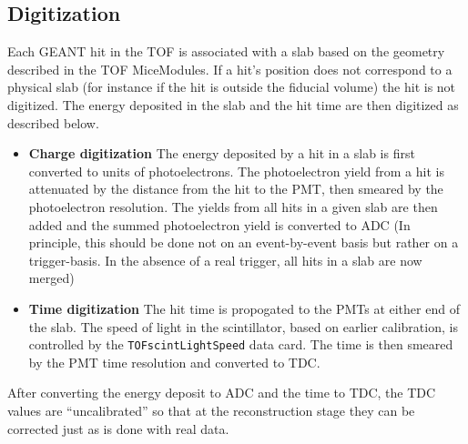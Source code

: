 \subsection{Digitization}
Each GEANT hit in the TOF is associated with a slab based on the 
geometry described in the TOF MiceModules. If a hit's position does not 
correspond to a physical slab (for instance if the hit is outside the fiducial volume) the hit is not digitized.
The energy deposited in the slab and the hit time are then digitized as described below.
\begin{itemize}
\item {\bf{Charge digitization}}
The energy deposited by a hit in a slab is first converted to units of photoelectrons. The photoelectron yield from a hit is attenuated by the distance from the hit to the PMT, then smeared by the photoelectron resolution. The yields from all hits in a given slab are then added and the summed photoelectron yield is converted to ADC (In principle, this should be done not on an event-by-event basis but rather on a trigger-basis. In the absence of a real trigger, all hits in a slab are now merged)
\item {\bf{Time digitization}}
The hit time is propogated to the PMTs at either end of the slab. The speed of light in the scintillator, based on earlier calibration, is controlled by the \verb|TOFscintLightSpeed| data card. The time is then smeared by the PMT time resolution and converted to TDC. 
\end{itemize}
After converting the energy deposit to ADC and the time to TDC, the TDC values are ``uncalibrated'' so that at the reconstruction stage they can be corrected just as is done with real data.

